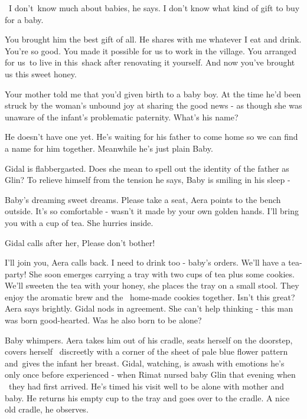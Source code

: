 \documentclass[letterpaper]{article}
\begin{document}
\ {\textquotedbl}I don't~know much about babies,{\textquotedbl} he says. {\textquotedbl}I don't know what kind of gift
to buy for a baby.{\textquotedbl} 

{\textquotedbl}You brought him the best gift of all. He shares with me whatever I eat and drink. You're so good. You
made it possible{ }for us to work in the village. You arranged for us~to live
in this~shack after renovating it yourself. And now you've brought us this sweet honey.{\textquotedbl} 

{\textquotedbl}Your mother told me that you'd given{ }birth to a baby
boy.{\textquotedbl} At the time he'd been struck by the woman's unbound joy at sharing the good news - as though she
was unaware of the infant's{ }problematic paternity. {\textquotedbl}What's his name?{\textquotedbl}

{\textquotedbl}He doesn't have one yet. He's waiting for his father to come home so we can find a name for him together.
Meanwhile he's just plain Baby.{\textquotedbl} 

Gidal is flabbergasted. Does she mean to spell out the identity of the father as Glin? To relieve himself from the
tension he says, {\textquotedbl}Baby is smiling in his sleep -{\textquotedbl} ~

{\textquotedbl}Baby's dreaming sweet dreams. Please take a seat,{\textquotedbl} Aera points to the bench
outside{.} {\textquotedbl}It's so comfortable - wasn't it made by your own
golden hands. I'll bring you with a cup of tea.{\textquotedbl} She hurries inside. 

Gidal calls after her, {\textquotedbl}Please don't bother!{\textquotedbl} 


\bigskip

{\textquotedbl}I'll join you,{\textquotedbl} Aera calls back. {\textquotedbl}I need to drink too - baby's orders. We'll
have a tea-party!{\textquotedbl} She soon emerges carrying a tray with two cups of tea plus some cookies.
{\textquotedbl}We'll sweeten the tea with your honey,{\textquotedbl}{ }she
places the tray on a small stool. They enjoy the aromatic brew and the \ home-made cookies together.
{\textquotedbl}Isn't this great?{\textquotedbl} Aera says brightly. Gidal nods in agreement. She can't help thinking -
this man was born good-hearted. Was he also born to be alone?

Baby whimpers. Aera takes him out of his cradle, seats herself on the doorstep, covers herself
{\ }discreetly{ }with a corner of the
sheet of pale blue flower pattern and~gives the infant her breast. Gidal, watching, is awash with
emotions{ }he's only once before experienced - when Rimat nursed baby Glin that evening when \ they had
first arrived. He's timed his visit well to be alone with mother and baby. He returns his empty cup to the tray and
goes over to the cradle. {\textquotedbl}A nice old cradle,{\textquotedbl} he
observes{.}
\end{document}
